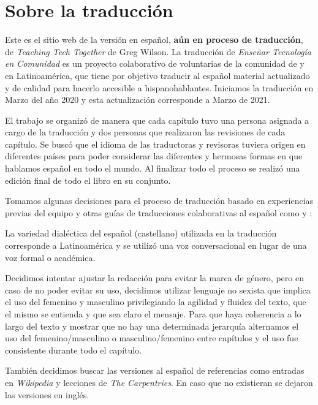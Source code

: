 \chapter*{Sobre la traducción}\label{s:traduccion}

Este es el sitio web de la versión en español, \textbf{aún en proceso de traducción}, de \emph{Teaching Tech Together} de Greg Wilson.
La traducción de \emph{Enseñar Tecnología en Comunidad} es un proyecto colaborativo
de voluntarias de la comunidad de  y 
 en Latinoamérica,
que tiene por objetivo traducir al español material actualizado 
y de calidad para hacerlo accesible a hispanohablantes.
Iniciamos la traducción en Marzo del año 2020 y esta actualización corresponde a Marzo de 2021.

El trabajo se organizó de manera que cada capítulo tuvo una persona asignada a cargo de la traducción 
y dos personas que realizaron las revisiones de cada capítulo.  
Se buscó que el idioma de las traductoras y revisoras tuviera origen en diferentes países para
poder considerar las diferentes y hermosas formas en que hablamos español en todo el mundo.
Al finalizar todo el proceso se realizó una edición final de todo el libro en su conjunto.

Tomamos algunas decisiones para el proceso de traducción basado en experiencias previas
del equipo y otras guías de traducciones colaborativas al español como 
y :

La variedad dialéctica del español (castellano) utilizada en la traducción corresponde 
a Latinoamérica y se utilizó una voz conversacional en lugar de una voz formal o académica.

Decidimos intentar ajustar la redacción para evitar la marca de género, pero
en caso de no poder evitar su uso, decidimos utilizar lenguaje no sexista  
que implica el uso del femenino y masculino privilegiando la agilidad y fluidez del texto, 
que el mismo se entienda y que sea claro el mensaje. Para que haya coherencia 
a lo largo del texto y mostrar que no hay una determinada jerarquía 
alternamos el uso del femenino/masculino o masculino/femenino entre capítulos 
y el uso fue consistente durante todo el capítulo. 

También decidimos buscar las versiones al español de referencias como 
entradas en \emph{Wikipedia} y lecciones de \emph{The Carpentries}.  En caso que no existieran 
se dejaron las versiones en inglés.

